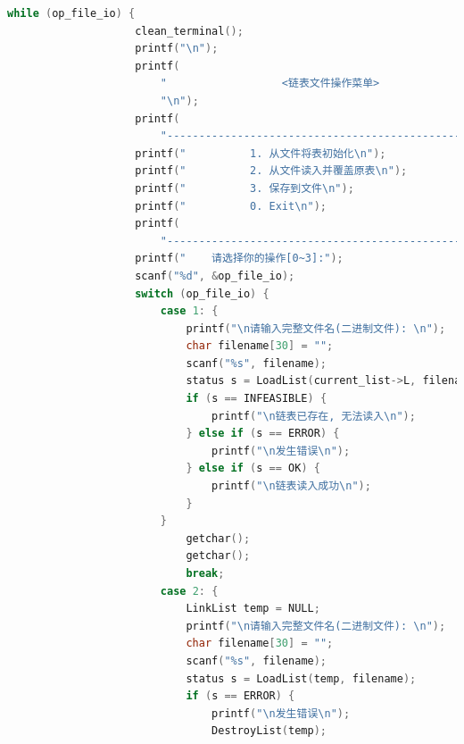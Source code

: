 \documentclass[supercite]{Experimental_Report}
\theoremstyle{definition}
\begin{document}
\begin{lstlisting}[caption={$main.cpp$}, language=C++, frame=single]
				while (op_file_io) {
					clean_terminal();
					printf("\n");
					printf(
						"                  <链表文件操作菜单>                "
						"\n");
					printf(
						"-------------------------------------------------\n");
					printf("    	  1. 从文件将表初始化\n");
					printf("    	  2. 从文件读入并覆盖原表\n");
					printf("    	  3. 保存到文件\n");
					printf("    	  0. Exit\n");
					printf(
						"-------------------------------------------------\n");
					printf("    请选择你的操作[0~3]:");
					scanf("%d", &op_file_io);
					switch (op_file_io) {
						case 1: {
							printf("\n请输入完整文件名(二进制文件): \n");
							char filename[30] = "";
							scanf("%s", filename);
							status s = LoadList(current_list->L, filename);
							if (s == INFEASIBLE) {
								printf("\n链表已存在, 无法读入\n");
							} else if (s == ERROR) {
								printf("\n发生错误\n");
							} else if (s == OK) {
								printf("\n链表读入成功\n");
							}
						}
							getchar();
							getchar();
							break;
						case 2: {
							LinkList temp = NULL;
							printf("\n请输入完整文件名(二进制文件): \n");
							char filename[30] = "";
							scanf("%s", filename);
							status s = LoadList(temp, filename);
							if (s == ERROR) {
								printf("\n发生错误\n");
								DestroyList(temp);


\end{lstlisting}
\end{document}
